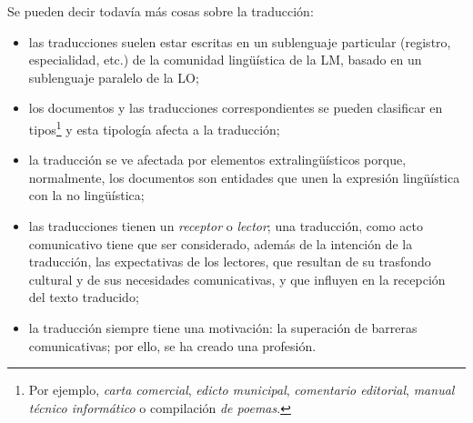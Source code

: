 Se pueden decir todavía más cosas sobre la traducción: \begin{itemize} \item las traducciones suelen estar escritas en un sublenguaje particular (registro, especialidad, etc.) de la comunidad lingüística de la LM, basado en un sublenguaje paralelo de la LO; \item los documentos y las traducciones correspondientes se pueden clasificar en tipos\footnote{Por ejemplo, \emph{carta comercial}, \emph{edicto municipal}, \emph{comentario editorial}, \emph{manual técnico informático} o compilación \emph{de poemas}. } y esta tipología afecta a la traducción; \item la traducción se ve afectada por elementos extralingüísticos porque, normalmente, los documentos son entidades que unen la expresión lingüística con la no lingüística; \item las traducciones tienen un \emph{receptor} o \emph{lector}; una traducción, como acto comunicativo tiene que ser considerado, además de la intención de la traducción, las expectativas de los lectores, que resultan de su trasfondo cultural y de sus necesidades comunicativas, y que influyen en la recepción del texto traducido; \item la traducción siempre tiene una motivación: la superación de barreras comunicativas; por ello, se ha creado una profesión. \end{itemize} 

